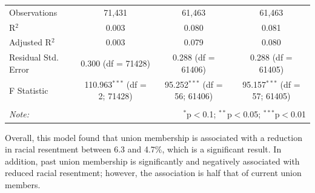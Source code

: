\documentclass[12pt,letterpaper]{article}
\begin{document}
\begin{table}[H]
{\begin{tabular}{@{\extracolsep{5pt}}lccc}
		Observations & 71,431 & 61,463 & 61,463 \\ 
		R$^{2}$ & 0.003 & 0.080 & 0.081 \\ 
		Adjusted R$^{2}$ & 0.003 & 0.079 & 0.080 \\ 
		Residual Std. Error & 0.300 (df = 71428) & 0.288 (df = 61406) & 0.288 (df = 61405) \\ 
		F Statistic & 110.963$^{***}$ (df = 2; 71428) & 95.252$^{***}$ (df = 56; 61406) & 95.157$^{***}$ (df = 57; 61405) \\ 
		\hline 
		\hline \\[-1.8ex] 
		\textit{Note:}  & \multicolumn{3}{r}{$^{*}$p$<$0.1; $^{**}$p$<$0.05; $^{***}$p$<$0.01} \\ 
	\end{tabular} 
}
 
Overall, this model found that union membership is associated with a reduction in racial resentment between 6.3 and 4.7\%, which is a significant result. In addition, past union membership is significantly and negatively associated with reduced racial resentment; however, the association is half that of current union members. 

\end{table} 
\end{document}
